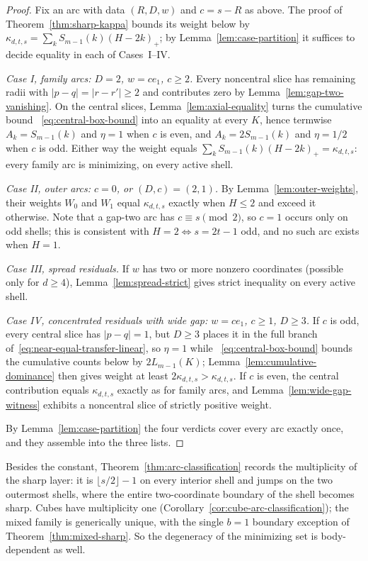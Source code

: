 \documentclass[pdflatex,sn-mathphys-num]{sn-jnl}
\theoremstyle{thmstyleone}
\theoremstyle{thmstylethree}
\theoremstyle{thmstyletwo}
\begin{document}
\begin{proof}
Fix an arc with data $(R,D,w)$ and $c=s-R$ as above.  The proof of
Theorem~\ref{thm:sharp-kappa} bounds its weight below by
$\kappa_{d,t,s}=\sum_kS_{m-1}(k)(H-2k)_+$; by
Lemma~\ref{lem:case-partition} it suffices to decide equality in each of
Cases~I--IV.

\emph{Case I, family arcs: $D=2$, $w=ce_1$, $c\ge2$.}
Every noncentral slice has remaining radii with $|p-q|=|r-r'|\ge2$ and
contributes zero by Lemma~\ref{lem:gap-two-vanishing}.  On the central
slices, Lemma~\ref{lem:axial-equality} turns the cumulative bound
~\eqref{eq:central-box-bound} into an equality at every $K$, hence
termwise $A_k=S_{m-1}(k)$ and $\eta=1$ when $c$ is even, and
$A_k=2S_{m-1}(k)$ and $\eta=1/2$ when $c$ is odd.  Either way the weight
equals $\sum_kS_{m-1}(k)(H-2k)_+=\kappa_{d,t,s}$: every family arc is
minimizing, on every active shell.

\emph{Case II, outer arcs: $c=0$, or $(D,c)=(2,1)$.}
By Lemma~\ref{lem:outer-weights}, their weights $W_0$ and $W_1$ equal
$\kappa_{d,t,s}$ exactly when $H\le2$ and exceed it otherwise.  Note that a
gap-two arc has $c\equiv s\pmod2$, so $c=1$ occurs only on odd shells; this
is consistent with $H=2\iff s=2t-1$ odd, and no such arc exists when
$H=1$.

\emph{Case III, spread residuals.}
If $w$ has two or more nonzero coordinates (possible only for $d\ge4$),
Lemma~\ref{lem:spread-strict} gives strict inequality on every active
shell.

\emph{Case IV, concentrated residuals with wide gap: $w=ce_1$, $c\ge1$,
$D\ge3$.}
If $c$ is odd, every central slice has $|p-q|=1$, but $D\ge3$ places it in
the full branch of~\eqref{eq:near-equal-transfer-linear}, so $\eta=1$ while
~\eqref{eq:central-box-bound} bounds the cumulative counts below by
$2L_{m-1}(K)$; Lemma~\ref{lem:cumulative-dominance} then gives weight at
least $2\kappa_{d,t,s}>\kappa_{d,t,s}$.  If $c$ is even, the central
contribution equals $\kappa_{d,t,s}$ exactly as for family arcs, and
Lemma~\ref{lem:wide-gap-witness} exhibits a noncentral slice of strictly
positive weight.

By Lemma~\ref{lem:case-partition} the four verdicts cover every arc
exactly once, and they assemble into the three lists.
\end{proof}

Besides the constant, Theorem~\ref{thm:arc-classification} records the
multiplicity of the sharp layer: it is $\lfloor s/2\rfloor-1$ on every
interior shell and jumps on the two outermost shells, where the entire
two-coordinate boundary of the shell becomes sharp.  Cubes have multiplicity
one (Corollary~\ref{cor:cube-arc-classification}); the mixed family is
generically unique, with the single $b=1$ boundary exception of
Theorem~\ref{thm:mixed-sharp}.  So the degeneracy of the minimizing set is
body-dependent as well.
\end{document}
